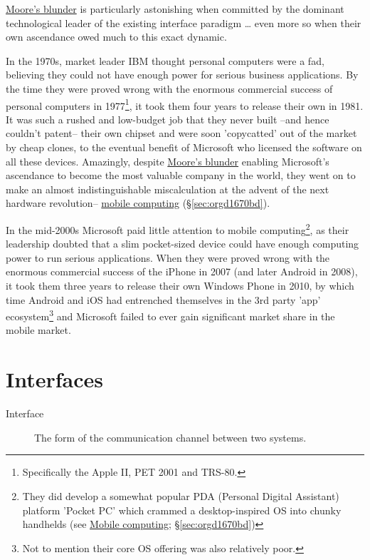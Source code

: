 \documentclass[logo,bsc,singlespacing,parskip]{infthesis}
\begin{document}
\hyperref[orgff69fb1]{Moore's blunder} is particularly astonishing when committed by the dominant technological leader of the existing interface paradigm \ldots{} even more so when their own ascendance owed much to this exact dynamic.

In the 1970s, market leader IBM thought personal computers were a fad, believing they could not have enough power for serious business applications.
By the time they were proved wrong with the enormous commercial success of personal computers in 1977\footnote{Specifically the Apple II, PET 2001 and TRS-80.}, it took them four years to release their own in 1981. It was such a rushed and low-budget job that they never built --and hence couldn't patent-- their own chipset and were soon 'copycatted' out of the market by cheap clones, to the eventual benefit of Microsoft who licensed the software on all these devices.
Amazingly, despite \hyperref[orgff69fb1]{Moore's blunder} enabling Microsoft's ascendance to become the most valuable company in the world, they went on to make an almost indistinguishable miscalculation at the advent of the next hardware revolution-- \hyperref[sec:orgd1670bd]{mobile computing} (\S \ref{sec:orgd1670bd}).

In the mid-2000s Microsoft paid little attention to mobile computing\footnote{They did develop a somewhat popular PDA (Personal Digital Assistant) platform 'Pocket PC' which crammed a desktop-inspired OS into chunky handhelds (see \hyperref[sec:orgd1670bd]{Mobile computing}; \S \ref{sec:orgd1670bd})}, as their leadership doubted that a slim pocket-sized device could have enough computing power to run serious applications.
When they were proved wrong with the enormous commercial success of the iPhone in 2007 (and later Android in 2008), it took them three years to release their own Windows Phone in 2010, by which time Android and iOS had entrenched themselves in the 3rd party 'app' ecosystem\footnote{Not to mention their core OS offering was also relatively poor.} and Microsoft failed to ever gain significant market share in the mobile market.

\chapter{Interfaces}
\label{sec:org17f0df0}
\begin{mdframed}
\begin{description}
\item[{Interface\label{Interface}}] The form of the communication channel between two systems.
\end{description}
\end{mdframed}
\end{document}
